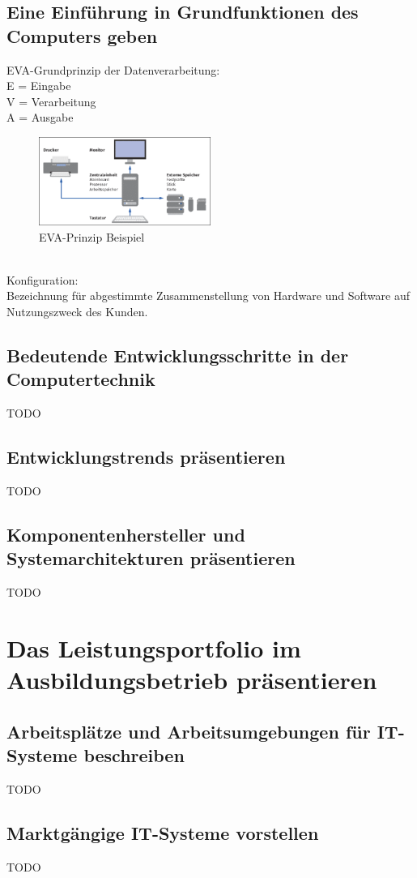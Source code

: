 \documentclass[11pt]{article}
\begin{document}
\subsection{Eine Einführung in Grundfunktionen des Computers geben}
    EVA-Grundprinzip der Datenverarbeitung:\\
    E = Eingabe\\
    V = Verarbeitung\\
    A = Ausgabe
    \begin{figure}[h]
        \centering
        \includegraphics[width=0.5\textwidth]{./images/2.1.1_konfiguration.png}
        \caption{EVA-Prinzip Beispiel}\label{fig:EVA-Prinzip}
    \end{figure}\\
    Konfiguration:\\
    Bezeichnung für abgestimmte Zusammenstellung von Hardware und Software auf Nutzungszweck des Kunden.
\subsection{Bedeutende Entwicklungsschritte in der Computertechnik}
    TODO
\subsection{Entwicklungstrends präsentieren}
    TODO
\subsection{Komponentenhersteller und Systemarchitekturen präsentieren}
    TODO

\section{Das Leistungsportfolio im Ausbildungsbetrieb präsentieren}
\subsection{Arbeitsplätze und Arbeitsumgebungen für IT-Systeme beschreiben}
    TODO
\subsection{Marktgängige IT-Systeme vorstellen}
    TODO
\end{document}
